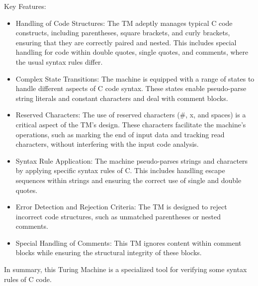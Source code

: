 \documentclass{article}
\begin{document}
Key Features:

\begin{itemize}
\item Handling of Code Structures: The TM adeptly manages typical C code constructs, including parentheses, square brackets, and curly brackets, ensuring that 
they are correctly paired and nested. This includes special handling for code within double quotes, single quotes, and comments, where the usual syntax rules differ. 
\item  Complex State Transitions: The machine is equipped with a range of states to handle different aspects of C code syntax. These states enable pseudo-parse string 
literals and constant characters and deal with comment blocks. 
\item Reserved Characters: The use of reserved characters ($\#$, x, and spaces) is a critical aspect of the TM's design. These characters facilitate the machine's operations, 
such as marking the end of input data and tracking read characters, without interfering with the input code analysis.
\item Syntax Rule Application: The machine pseudo-parses strings and characters by applying specific syntax rules of C. This includes handling escape sequences within 
strings and ensuring the correct use of single and double quotes. 
\item Error Detection and Rejection Criteria: The TM is designed to reject incorrect code structures, such as unmatched parentheses or nested comments. 
\item  Special Handling of Comments: This TM ignores content within comment blocks while ensuring the structural integrity of these blocks.
\end{itemize}

In summary, this Turing Machine is a specialized tool for verifying some syntax rules of C code. 
\end{document}
